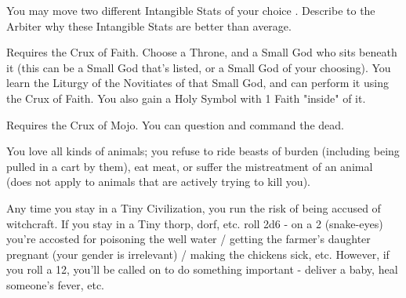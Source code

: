 {    

    You may move two different Intangible Stats of your choice \DCUP.  Describe to the Arbiter why these Intangible Stats are better than average.


    Requires the Crux of Faith.  Choose a Throne, and a Small God who sits beneath it (this can be a Small God that's listed, or a Small God of your choosing).  You learn the Liturgy of the Novitiates of that Small God, and can perform it using the Crux of Faith.  You also gain a Holy Symbol with 1 Faith \POOL "inside" of it.\footnotemark[\value{footnote}]


    Requires the Crux of Mojo.  You can question and command the dead.\footnotemark[\value{footnote}]






  You love all kinds of animals; you refuse to ride beasts of burden (including being pulled in a cart by them), eat meat, or suffer the mistreatment of an animal (does not apply to animals that are actively trying to kill you).

  
  Any time you stay in a Tiny Civilization, you run the risk of being accused of witchcraft.  If you stay in a Tiny thorp, dorf, etc. roll 2d6 - on a 2 (snake-eyes) you're accosted for poisoning the well water / getting the farmer's daughter pregnant (your gender is irrelevant) / making the chickens sick, etc.  However, if you roll a 12, you'll be called on to do something important - deliver a baby, heal someone's fever, etc.

}
